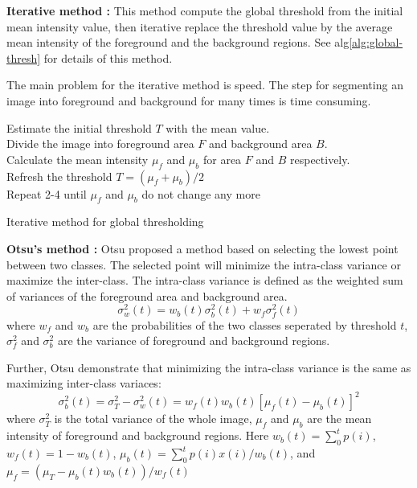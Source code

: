 \textbf{Iterative method :} This method compute the global threshold from the initial mean intensity value, then iterative replace the threshold value by the average mean intensity of the foreground and the background regions. See alg\ref{alg:global-thresh} for details of this method.

The main problem for the iterative method is speed. The step for segmenting an image into foreground and background for many times is time consuming.

\begin{algorithm}
\SetAlgoLined
{}
Estimate the initial threshold $T$ with the mean value.\\
Divide the image into foreground area $F$ and background area $B$.\\
Calculate the mean intensity $\mu_f$ and $\mu_b$ for area $F$ and $B$ respectively.\\
Refresh the threshold $T = (\mu_f + \mu_b)/2$\\
Repeat 2-4 until $\mu_f$ and $\mu_b$ do not change any more
\caption{Iterative method for global thresholding}
\label{alg:global-thresh}
\end{algorithm}
\textbf{Otsu's method : } Otsu \cite{otsu1975threshold} proposed a method based on selecting the lowest point between two classes. The selected point will minimize the intra-class variance or maximize the inter-class. The intra-class variance is defined as the weighted sum of variances of the foreground area and background area.
\begin{equation} \label{eq:intra-var}
\sigma_w^2(t) = w_b(t)\sigma_b^2(t) + w_f\sigma_f^2(t)
\end{equation}
where $w_f$ and $w_b$ are the probabilities of the two classes seperated by threshold $t$, $\sigma_f^2$ and $\sigma_b^2$ are the variance of foreground and background regions.

Further, Otsu demonstrate that minimizing the intra-class variance is the same as maximizing inter-class variaces:
\begin{equation} \label{eq:inter-var}
\sigma_b^2(t) = \sigma_T^2 - \sigma_w^2(t) = w_f(t)w_b(t)[\mu_f(t) - \mu_b(t)]^2
\end{equation}
where $\sigma_T^2$ is the total variance of the whole image, $\mu_f$ and $\mu_b$ are the mean intensity of foreground and background regions. Here $w_b(t) = \sum_0^tp(i)$, $w_f(t) = 1 - w_b(t)$, $\mu_b(t) = \sum_0^tp(i)x(i)/w_b(t)$, and $\mu_f = (\mu_T - \mu_b(t)w_b(t))/w_f(t)$

